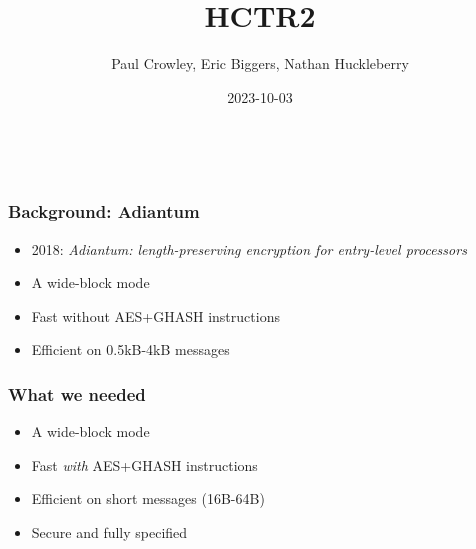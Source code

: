 \documentclass[aspectratio=169]{beamer}
\title{HCTR2}
\author{Paul Crowley, Eric Biggers, Nathan Huckleberry}
\institute{Google LLC}
\date{2023-10-03}
\newenvironment*{figslide}{
    \begin{columns}
        \begin{column}{.4\textwidth}

}{
\end{column}
\begin{column}{.6\textwidth}
    \begin{figure}
        
    \end{figure}
\end{column}
\end{columns}
}
\begin{document}
\begin{frame}
    \begin{figslide}
        \titlepage
    \end{figslide}
\end{frame}

\begin{frame}

\frametitle{Background: Adiantum}

\begin{itemize}
    \item 2018: \textit{Adiantum: length-preserving encryption for entry-level processors}
    \item A wide-block mode
    \item Fast without AES+GHASH instructions
    \item Efficient on 0.5kB-4kB messages
\end{itemize}
\end{frame}

\begin{frame}

    \frametitle{What we needed}
    
    \begin{itemize}
        \item A wide-block mode
        \item Fast \textit{with} AES+GHASH instructions
        \item Efficient on short messages (16B-64B)
        \item Secure and fully specified
    \end{itemize}
\end{frame}

\toggletrue{oldhctr}
\end{document}
